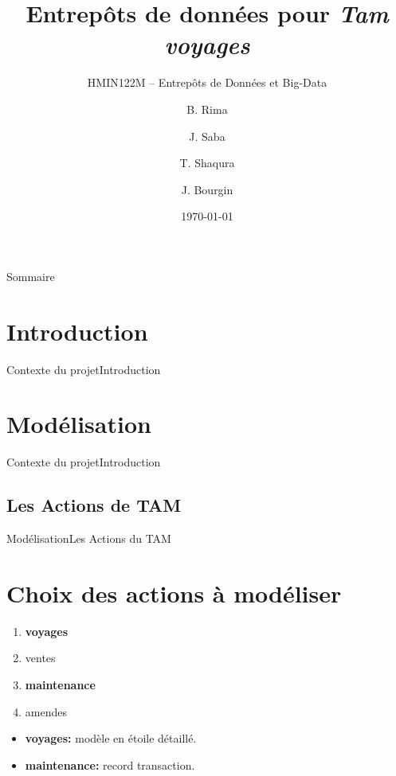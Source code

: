 \documentclass[usenames,dvipsnames]{beamer}
\title{Entrepôts de données pour \textit{Tam voyages}}
\subtitle{HMIN122M -- Entrepôts de Données et Big-Data}
\author{B. Rima \and J. Saba \and T. Shaqura \and J. Bourgin}
\institute[UM]{M1 Informatique AIGLE}
\date{\today}
\begin{document}
\begin{frame}
\titlepage
\end{frame}
\begin{frame}{Sommaire}
\tableofcontents
\end{frame}
\section{Introduction}
\begin{frame}{Contexte du projet}{Introduction}
\end{frame}

\section{Modélisation}
\begin{frame}{Contexte du projet}{Introduction}
\end{frame}

\subsection{Les Actions de TAM}
\begin{frame}{Modélisation}{Les Actions du TAM}
\section{Choix des actions à modéliser}
\begin{enumerate}
  \item \textbf{voyages}
  \item ventes
  \item \textbf{maintenance}
  \item amendes
\end{enumerate}
\begin{itemize}
  \item[] \textbf{voyages:} modèle en étoile détaillé.
  \item[] \textbf{maintenance:} record transaction.
\end{itemize}
\end{frame}
\end{document}
